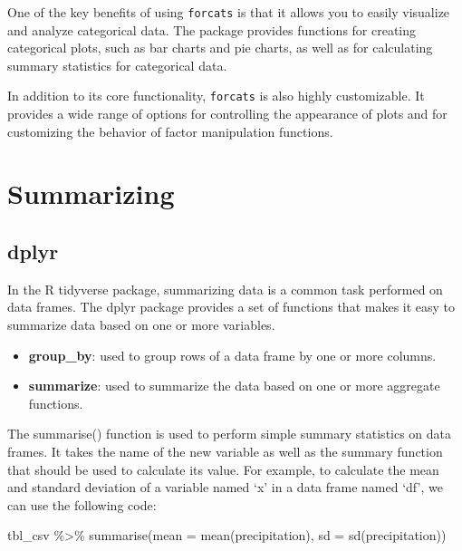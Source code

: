 \documentclass[
]{book}
\newenvironment{Shaded}{\begin{snugshade}}{\end{snugshade}}
\newcommand{\AttributeTok}[1]{\textcolor[rgb]{0.77,0.63,0.00}{#1}}
\newcommand{\FunctionTok}[1]{\textcolor[rgb]{0.00,0.00,0.00}{#1}}
\newcommand{\NormalTok}[1]{#1}
\newcommand{\SpecialCharTok}[1]{\textcolor[rgb]{0.00,0.00,0.00}{#1}}
\providecommand{\tightlist}{%
  \setlength{\itemsep}{0pt}\setlength{\parskip}{0pt}}
\begin{document}
One of the key benefits of using \texttt{forcats} is that it allows you to easily visualize and analyze categorical data. The package provides functions for creating categorical plots, such as bar charts and pie charts, as well as for calculating summary statistics for categorical data.

In addition to its core functionality, \texttt{forcats} is also highly customizable. It provides a wide range of options for controlling the appearance of plots and for customizing the behavior of factor manipulation functions.

\hypertarget{summarizing}{%
\section{Summarizing}\label{summarizing}}

\hypertarget{dplyr-1}{%
\subsection{dplyr}\label{dplyr-1}}

In the R tidyverse package, summarizing data is a common task performed on data frames. The dplyr package provides a set of functions that makes it easy to summarize data based on one or more variables.

\begin{itemize}
\tightlist
\item
  \textbf{group\_by}: used to group rows of a data frame by one or more columns.
\item
  \textbf{summarize}: used to summarize the data based on one or more aggregate functions.
\end{itemize}

The summarise() function is used to perform simple summary statistics on data frames. It takes the name of the new variable as well as the summary function that should be used to calculate its value. For example, to calculate the mean and standard deviation of a variable named `x' in a data frame named `df', we can use the following code:

\begin{Shaded}
\begin{Highlighting}[]
\NormalTok{tbl\_csv }\SpecialCharTok{\%\textgreater{}\%}
  \FunctionTok{summarise}\NormalTok{(}\AttributeTok{mean =} \FunctionTok{mean}\NormalTok{(precipitation), }
            \AttributeTok{sd =} \FunctionTok{sd}\NormalTok{(precipitation))}
\end{Highlighting}
\end{Shaded}
\end{document}
